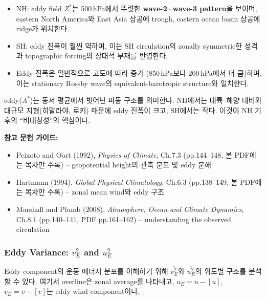 \begin{remark}
\begin{itemize}
  \item NH: eddy field $Z^{*}$는 500\,hPa에서 뚜렷한 \textbf{wave-2$\sim$wave-3 pattern}을 보이며,
        eastern North America와 East Asia 상공에 trough, eastern ocean basin 상공에 ridge가 위치한다.
  \item SH: eddy 진폭이 훨씬 약하며, 이는 SH circulation의 zonally symmetric한 성격과
        topographic forcing의 상대적 부재를 반영한다.
  \item Eddy 진폭은 일반적으로 고도에 따라 증가 (850\,hPa보다 200\,hPa에서 더 큼)하며,
        이는 stationary Rossby wave의 equivalent-barotropic structure와 일치한다.
\end{itemize}
\end{remark}

\begin{hisublock}
eddy($A^{*}$)는 동서 평균에서 벗어난 파동 구조를 의미한다.
NH에서는 대륙--해양 대비와 대규모 지형(히말라야, 로키) 때문에 eddy 진폭이 크고,
SH에서는 작다. 이것이 NH 기후의 ``비대칭성''의 핵심이다.
\end{hisublock}

\begin{hisublock}
\textbf{참고 문헌 가이드:}
\begin{itemize}
  \item Peixoto and Oort (1992), \textit{Physics of Climate}, Ch.7.3 (pp.144--148, 본 PDF에는 목차만 수록) -- geopotential height의 관측 분포 및 eddy 분해
  \item Hartmann (1994), \textit{Global Physical Climatology}, Ch.6.3 (pp.138--149, 본 PDF에는 목차만 수록) -- zonal mean wind와 eddy 구조
  \item Marshall and Plumb (2008), \textit{Atmosphere, Ocean and Climate Dynamics}, Ch.8.1 (pp.140--141, PDF pp.161--162) -- understanding the observed circulation
\end{itemize}
\end{hisublock}


\subsubsection{Eddy Variance: $\overline{v_{E}^{2}}$ and $\overline{u_{E}^{2}}$}
\label{sec:ch03-eddy-variance}

Eddy component의 운동 에너지 분포를 이해하기 위해 $\overline{v_{E}^{2}}$와 $\overline{u_{E}^{2}}$의
위도별 구조를 분석할 수 있다.  여기서 overline은 zonal average를 나타내고,
$u_{E} = u - [u]$, $v_{E} = v - [v]$는 eddy wind component이다.

